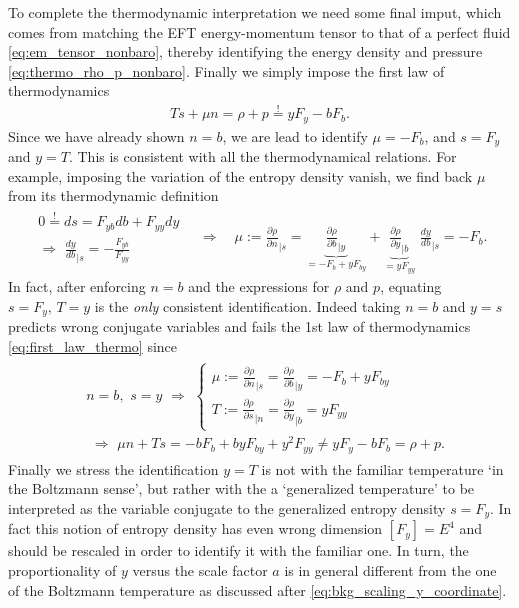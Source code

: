 To complete the thermodynamic interpretation we need some final imput, which comes from matching the EFT energy-momentum tensor to that of a perfect fluid \eqref{eq:em_tensor_nonbaro}, thereby identifying the energy density and pressure \eqref{eq:thermo_rho_p_nonbaro}.
Finally we simply impose the first law of thermodynamics
\begin{align}\label{eq:first_law_thermo}
    T s+ \mu n = \rho+p \overset{!}{=} yF_y-bF_b.
\end{align}
Since we have already shown $n=b$, we are lead to identify $\mu=-F_b$, and $s=F_y$ and $y=T$.
This is consistent with all the thermodynamical relations. For example, imposing the variation of the entropy density vanish, we find back $\mu$ from its thermodynamic definition
\begin{align}\label{eq:chemical_potential_and_entropy_consistency}
    \begin{array}{c}
     0\overset{!}{=}ds = F_{yb} db + F_{yy}dy\\[3pt]
    \displaystyle\Rightarrow\,\, \frac{dy}{db}_{|s}=-\frac{F_{yb}}{F_{yy}}
    \end{array}
    \quad\Rightarrow\quad \mu:=\frac{\partial\rho}{\partial n}_{|s}= \underbrace{\frac{\partial\rho}{\partial b}_{|y}}_{=-F_b+yF_{by}}+ \underbrace{\frac{\partial\rho}{\partial y}_{|b}}_{=yF_{yy}}\,\,\frac{dy}{db}_{|s}=-F_b.
\end{align}
In fact, after enforcing $n=b$ and the expressions for $\rho$ and $p$, equating $s=F_y,\,T=y$ is the \emph{only} consistent identification.
Indeed taking $n=b$ and $y=s$ predicts wrong conjugate variables and fails the 1st law of thermodynamics \eqref{eq:first_law_thermo} since
\begin{align}\begin{aligned}
    &n=b,\,\,s= y \,\,\Rightarrow\,\, \begin{cases}
        \mu:=\frac{\partial\rho}{\partial n}_{|s}= \frac{\partial\rho}{\partial b}_{|y}=-F_b+yF_{by}\\
         T:=\frac{\partial\rho}{\partial s}_{|n}= \frac{\partial\rho}{\partial y}_{|b}=yF_{yy}
    \end{cases}\\[4pt]
    &\,\,\Rightarrow\,\, \mu n +T s= -bF_b+byF_{by}+y^2F_{yy}\neq yF_y-bF_b=\rho+p.
\end{aligned}\end{align}
Finally we stress the identification $y=T$ is not with the familiar temperature `in the Boltzmann sense', but rather with the a `generalized temperature' to be interpreted as the variable conjugate to the generalized entropy density $s=F_y$.
In fact this notion of entropy density has even wrong dimension $[F_y]=E^4$ and should be rescaled in order to identify it with the familiar one.
In turn, the proportionality of $y$ versus the scale factor $a$ is in general different from the one of the Boltzmann temperature as discussed after \eqref{eq:bkg_scaling_y_coordinate}.


